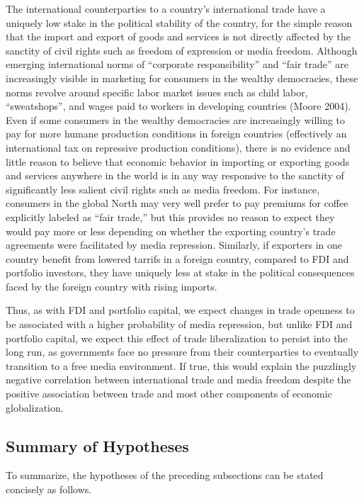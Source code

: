 \documentclass[a4paper]{article}\usepackage[]{graphicx}\usepackage[]{color}
\begin{document}
The international counterparties to a country's international trade have a uniquely low stake in the political stability of the country, for the simple reason that the import and export of goods and services is not directly affected by the sanctity of civil rights such as freedom of expression or media freedom. Although emerging international norms of “corporate responsibility” and “fair trade” are increasingly visible in marketing for consumers in the wealthy democracies, these norms revolve around specific labor market issues such as child labor, “sweatshops”, and wages paid to workers in developing countries (Moore 2004). Even if some consumers in the wealthy democracies are increasingly willing to pay for more humane production conditions in foreign countries (effectively an international tax on repressive production conditions), there is no evidence and little reason to believe that economic behavior in importing or exporting goods and services anywhere in the world is in any way responsive to the sanctity of significantly less salient civil rights such as media freedom. For instance, consumers in the global North may very well prefer to pay premiums for coffee explicitly labeled as “fair trade,” but this provides no reason to expect they would pay more or less depending on whether the exporting country's trade agreements were facilitated by media repression. Similarly, if exporters in one country benefit from lowered tarrifs in a foreign country, compared to FDI and portfolio investors, they have uniquely less at stake in the political consequences faced by the foreign country with rising imports.

Thus, as with FDI and portfolio capital, we expect changes in trade openness to be associated with a higher probability of media repression, but unlike FDI and portfolio capital, we expect this effect of trade liberalization to persist into the long run, as governments face no pressure from their counterparties to eventually transition to a free media environment. If true, this would explain the puzzlingly negative correlation between international trade and media freedom despite the positive association between trade and most other components of economic globalization.

\subsection{Summary of Hypotheses}

To summarize, the hypotheses of the preceding subsections can be stated concisely as follows.
\end{document}
